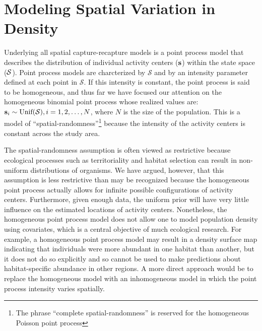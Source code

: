 


\chapter{%
Modeling Spatial Variation in Density
}
\label{chapt.state-space}

\vspace{0.3cm}

Underlying all spatial capture-recapture models is a point process
model that describes the distribution of individual activity
centers (${\bf s}$) within the state space ($\cal{S}$).
Point process models are charcterized by $\mathcal{S}$ and by an
intensity parameter defined at each point in $\mathcal{S}$. If this
intensity is constant, the point process is said to be homogeneous,
and thus far we have focused our
attention on the homogeneous binomial point process whose realized
values are:
${\bf s}_i \sim \mbox{Unif}({\cal S}), i=1,2,\dots,N$, where $N$ is the
size of the population. This is a model of
``spatial-randomness''\footnote{The phrase ``complete
  spatial-randomness'' is reserved for the homogeneous Poisson point
  process}
because the intensity of the
activity centers is constant across the study area.

The spatial-randomness assumption is often viewed as restrictive
because ecological processes such as
territoriality and habitat selection can result in non-uniform
distributions of organisms. We have argued, however, that this
assumption is less restrictive than may be recognized because the
homogeneous point process actually allows for infinite
possible configurations of activity centers. Furthermore, given enough data,
the uniform prior will have very little influence on the estimated
locations of activity centers. Nonetheless, the homogeneous point
process model does not allow one to model population density using
covariates, which is a central objective of much ecological research.
For example, a homogeneous point process model
may result in a density surface map indicating that individuals were
more abundant in one habitat than another, but it does not do so
explicitly and so cannot be used to make predictions about
habitat-specific abundance in other regions. A more direct approach would be to replace
the homogeneous model with an inhomogeneous model in which the point process
intensity varies spatially.

